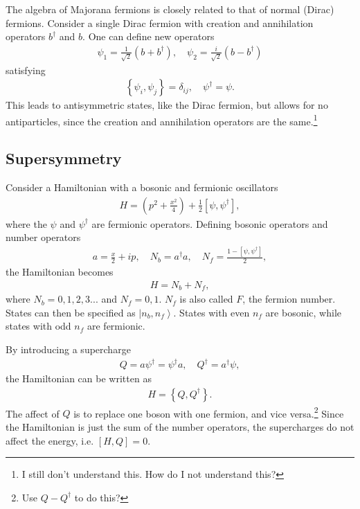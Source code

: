 \documentclass[12pt]{article} %
\renewcommand{\th}[1]{\frac{1}{#1}}
\newcommand{\ket}[1]{\left|#1\right\rangle}
\newcommand{\comm}[2]{\left[#1,#2\right]}
\newcommand{\acom}[2]{\left\{#1,#2\right\}}
\begin{document}
The algebra of Majorana fermions is closely related to that of normal (Dirac) fermions. Consider a single Dirac fermion with creation and annihilation operators $b^\dag$ and $b$. One can define new operators
\begin{align}
\psi_1 = \th{\sqrt{2}}(b+b^\dag ),\quad \psi_2 = \frac{i}{\sqrt{2}}(b-b^\dag)
\end{align}
satisfying
\begin{align}
\acom{\psi_i}{\psi_j} = \delta_{ij},\quad \psi^\dag=\psi.
\end{align}
This leads to antisymmetric states, like the Dirac fermion, but allows for no antiparticles, since the creation and annihilation operators are the same.\footnote{I still don't understand this. How do I not understand this?}

\subsection{Supersymmetry} \emph{} \label{sub:susy}

Consider a Hamiltonian with a bosonic and fermionic oscillators
\begin{align}
H = \left(p^2+\frac{x^2}{4}\right) + \th{2}\left[\psi, \psi^\dag\right],
\end{align}
where the $\psi$ and $\psi^\dag$ are fermionic operators. Defining bosonic operators and number operators
\begin{align}
a = \frac{x}{2}+ip,\quad N_b = a^\dag a,\quad N_f = \frac{1-\comm{\psi}{ \psi^\dag}}{2},
\end{align}
the Hamiltonian becomes
\begin{align}
H = N_b + N_f,
\end{align}
where $N_b = 0,1,2,3...$ and $N_f = 0,1$. $N_f$ is also called $F$, the fermion number. States can then be specified as $\ket{n_b,n_f}$. States with even $n_f$ are bosonic, while states with odd $n_f$ are fermionic.
 
By introducing a supercharge 
\begin{align}
Q = a\psi^\dag = \psi^\dag a,\quad Q^\dag = a^\dag\psi,
\end{align}
the Hamiltonian can be written as 
\begin{align}
H = \acom{Q}{Q^\dag}.
\end{align}
The affect of $Q$ is to replace one boson with one fermion, and vice versa.\footnote{Use $Q-Q^\dag$ to do this?} Since the Hamiltonian is just the sum of the number operators, the supercharges do not affect the energy, i.e. $\comm{H}{Q} = 0$.
\end{document}
